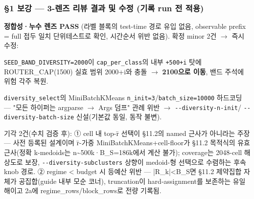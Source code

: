 \subsubsection{§1 보강 — 3-렌즈 리뷰 결과 및 수정 (기록 run 전 적용)}
\textbf{정합성·누수 렌즈 PASS} (라벨 블록의 test-time 경로 유입 없음, observable prefix =\allowbreak{} full 접두 일치 단위테스트로 확인, 시간순서 위반 없음). 확정 minor 2건  \ensuremath{\rightarrow}  즉시 수정:

\par\noindent \textbullet\enspace \texttt{SEED\_\allowbreak{}\allowbreak{}BAN\allowbreak{}D\_\allowbreak{}\allowbreak{}DIVERS\allowbreak{}ITY=\allowbreak{}\allowbreak{}2000\allowbreak{}}이 \texttt{cap\_\allowbreak{}\allowbreak{}per\_\allowbreak{}\allowbreak{}class}의 내부 \texttt{+\allowbreak{}\allowbreak{}500+\allowbreak{}\allowbreak{}i} 탓에 ROUTER\_\allowbreak{}CAP(1500) 실효 범위 2000+\allowbreak{}i와 충돌  \ensuremath{\rightarrow}  \textbf{2100으로 이동}, 밴드 주석에 위험 각주 복원.


\par\noindent \textbullet\enspace \texttt{diversit\allowbreak{}y\_\allowbreak{}\allowbreak{}select\allowbreak{}}의 MiniBatchKMeans \texttt{n\_\allowbreak{}\allowbreak{}init=\allowbreak{}\allowbreak{}3\allowbreak{}}/\allowbreak{}\texttt{batch\_\allowbreak{}\allowbreak{}si\allowbreak{}ze=\allowbreak{}\allowbreak{}10000\allowbreak{}} 하드코딩 — "모든 하이퍼는 argparse  \ensuremath{\rightarrow}  Args 덤프" 관례 위반  \ensuremath{\rightarrow}  \texttt{-\allowbreak{}-\allowbreak{}divers\allowbreak{}ity-\allowbreak{}n-\allowbreak{}in\allowbreak{}it}/\allowbreak{} \texttt{-\allowbreak{}-\allowbreak{}divers\allowbreak{}ity-\allowbreak{}batc\allowbreak{}h-\allowbreak{}size} 신설(기본값 동일, 동작 불변).


기각 2건(수치 검증 후): ① cell 내 top-r̄ 선택이 §11.2의 named 근사가 아니라는 주장 — 사전 등록된 설계이며 r̄-가중 MiniBatchKMeans+\allowbreak{}cell-floor가 §11.2 목적식의 유효 근사(정확 k-medoids는 n\textasciitilde{}500k·B\_\allowbreak{}S=\allowbreak{}186k에서 계산 불가); coverage는 2048-cell 해상도로 보장, \texttt{-\allowbreak{}-\allowbreak{}divers\allowbreak{}ity-\allowbreak{}subc\allowbreak{}lusters} 상향이 medoid-형 선택으로 수렴하는 후속 knob 경로. ② regime < budget 시 등예산 위반 — |R\_\allowbreak{}k|<B\_\allowbreak{}S면 §11.2 제약집합 자체가 공집합(guide 내부 모순 코너), truncation이 hard-assignment를 보존하는 유일해이고 2a에 regime\_\allowbreak{}rows/\allowbreak{}block\_\allowbreak{}rows로 전량 기록됨.

